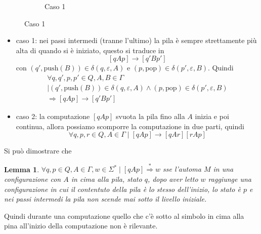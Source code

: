 \documentclass[12pt]{report}
\newtheorem{lemma}{Lemma}
\theoremstyle{definition}
\begin{document}
\begin{itemize}
\begin{figure}[H]
\begin{subfigure}{0.45\textwidth}
				\caption{Caso 1}
			\end{subfigure}
		\end{figure}
		\begin{itemize}
			\item caso 1: nei passi intermedi (tranne l'ultimo) la pila è sempre strettamente più alta di quando si è iniziato, questo si traduce in
				$$ [qAp] \rightarrow [q'Bp'] $$
				con $(q', \text{push}(B)) \in \delta(q, \varepsilon, A)$ e $(p, \text{pop}) \in \delta(p', \varepsilon, B)$.
				Quindi 
				\begin{multline*}
				\forall q, q', p, p' \in Q, A, B \in \Gamma \\ \mid
					(q', \text{push}(B)) \in \delta(q, \varepsilon, A) \wedge (p, \text{pop}) \in \delta(p', \varepsilon, B) \\
					\Rightarrow [qAp] \rightarrow [q'Bp'] 
				\end{multline*}
			\item caso 2: la computazione $[qAp]$ svuota la pila fino alla $A$ inizia e poi continua, allora possiamo scomporre la computazione in due parti, quindi
				$$ \forall q, p, r \in Q, A \in \Gamma \mid [qAp] \rightarrow [qAr][rAp] $$
		\end{itemize}
\end{itemize}
Si può dimostrare che
\begin{lemma}
	$\forall q, p \in Q, A \in \Gamma, w \in \Sigma^* \mid [qAp] \overset{*}{\Rightarrow} w$ sse 
	l'automa $M$ in una configurazione con $A$ in cima alla pila, stato $q$, dopo aver letto $w$ raggiunge una configurazione in cui il contentuto della pila è lo stesso dell'inizio, lo stato è $p$ e nei passi intermedi la pila non scende mai sotto il livello iniziale.
\end{lemma}
Quindi durante una computazione quello che c'è sotto al simbolo in cima alla pina all'inizio della computazione non è rilevante.
\end{document}
